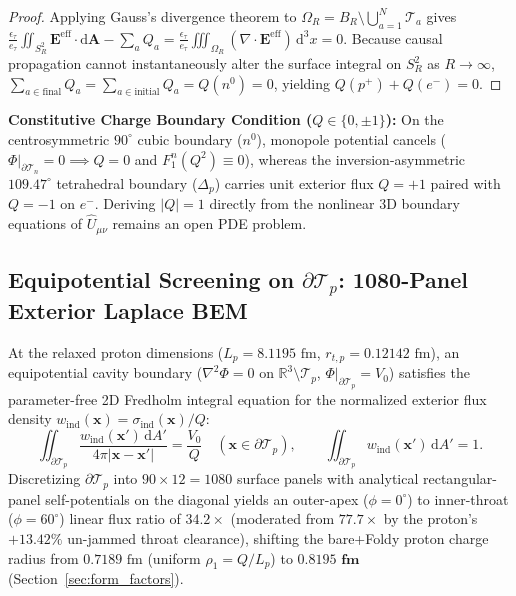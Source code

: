 \documentclass[11pt, a4paper]{article}
\DeclareRobustCommand{\dd}{\mathrm{d}}
\begin{document}
\begin{proof}
Applying Gauss's divergence theorem to $\Omega_R = B_R \setminus \bigcup_{a=1}^N \mathcal{T}_a$ gives $\frac{\epsilon_\tau}{e_\tau}\iint_{S^2_R} \mathbf{E}^{\mathrm{eff}}\cdot\dd\mathbf{A} - \sum_a Q_a = \frac{\epsilon_\tau}{e_\tau}\iiint_{\Omega_R} (\nabla\cdot\mathbf{E}^{\mathrm{eff}})\,\dd^3x = 0$. Because causal propagation cannot instantaneously alter the surface integral on $S^2_R$ as $R \to \infty$, $\sum_{a\in\mathrm{final}} Q_a = \sum_{a\in\mathrm{initial}} Q_a = Q(n^0) = 0$, yielding $Q(p^+) + Q(e^-) = 0$.
\end{proof}

\noindent\textbf{Constitutive Charge Boundary Condition ($Q \in \{0, \pm 1\}$):} On the centrosymmetric $90^\circ$ cubic boundary ($n^0$), monopole potential cancels ($\Phi|_{\partial\mathcal{T}_n} = 0 \implies Q = 0$ and $F_1^n(Q^2) \equiv 0$), whereas the inversion-asymmetric $109.47^\circ$ tetrahedral boundary ($\Delta_p$) carries unit exterior flux $Q = +1$ paired with $Q = -1$ on $e^-$. Deriving $|Q| = 1$ directly from the nonlinear 3D boundary equations of $\hat{U}_{\mu\nu}$ remains an open PDE problem.

\subsection{\texorpdfstring{Equipotential Screening on $\partial\mathcal{T}_p$: 1080-Panel Exterior Laplace BEM}{Equipotential Screening on dTp: 1080-Panel Exterior Laplace BEM}}
At the relaxed proton dimensions ($L_p = 8.1195\text{ fm}$, $r_{t,p} = 0.12142\text{ fm}$), an equipotential cavity boundary ($\nabla^2\Phi = 0$ on $\mathbb{R}^3 \setminus \mathcal{T}_p$, $\Phi|_{\partial\mathcal{T}_p} = V_0$) satisfies the parameter-free 2D Fredholm integral equation for the normalized exterior flux density $w_{\mathrm{ind}}(\mathbf{x}) = \sigma_{\mathrm{ind}}(\mathbf{x})/Q$:
\begin{equation}
    \iint_{\partial\mathcal{T}_p} \frac{w_{\mathrm{ind}}(\mathbf{x}')\,\dd A'}{4\pi|\mathbf{x} - \mathbf{x}'|} = \frac{V_0}{Q} \quad (\mathbf{x} \in \partial\mathcal{T}_p), \qquad
    \iint_{\partial\mathcal{T}_p} w_{\mathrm{ind}}(\mathbf{x}')\,\dd A' = 1.
    \label{eq:laplace_bem_proton}
\end{equation}
Discretizing $\partial\mathcal{T}_p$ into $90 \times 12 = 1080$ surface panels with analytical rectangular-panel self-potentials on the diagonal yields an outer-apex ($\phi = 0^\circ$) to inner-throat ($\phi = 60^\circ$) linear flux ratio of $\mathbf{34.2\times}$ (moderated from $77.7\times$ by the proton's $+13.42\%$ un-jammed throat clearance), shifting the bare+Foldy proton charge radius from $0.7189\text{ fm}$ (uniform $\rho_1 = Q/L_p$) to $\mathbf{0.8195\text{ fm}}$ (Section~\ref{sec:form_factors}).
\end{document}
